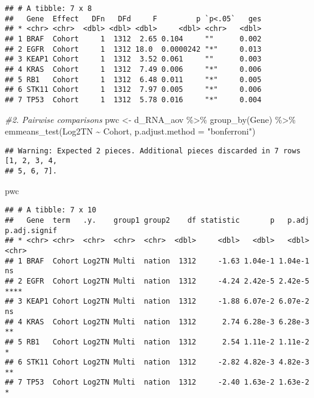 \documentclass[
]{article}
\newenvironment{Shaded}{\begin{snugshade}}{\end{snugshade}}
\newcommand{\AttributeTok}[1]{\textcolor[rgb]{0.77,0.63,0.00}{#1}}
\newcommand{\CommentTok}[1]{\textcolor[rgb]{0.56,0.35,0.01}{\textit{#1}}}
\newcommand{\FunctionTok}[1]{\textcolor[rgb]{0.00,0.00,0.00}{#1}}
\newcommand{\NormalTok}[1]{#1}
\newcommand{\OtherTok}[1]{\textcolor[rgb]{0.56,0.35,0.01}{#1}}
\newcommand{\SpecialCharTok}[1]{\textcolor[rgb]{0.00,0.00,0.00}{#1}}
\newcommand{\StringTok}[1]{\textcolor[rgb]{0.31,0.60,0.02}{#1}}
\begin{document}
\begin{verbatim}
## # A tibble: 7 x 8
##   Gene  Effect   DFn   DFd     F         p `p<.05`   ges
## * <chr> <chr>  <dbl> <dbl> <dbl>     <dbl> <chr>   <dbl>
## 1 BRAF  Cohort     1  1312  2.65 0.104     ""      0.002
## 2 EGFR  Cohort     1  1312 18.0  0.0000242 "*"     0.013
## 3 KEAP1 Cohort     1  1312  3.52 0.061     ""      0.003
## 4 KRAS  Cohort     1  1312  7.49 0.006     "*"     0.006
## 5 RB1   Cohort     1  1312  6.48 0.011     "*"     0.005
## 6 STK11 Cohort     1  1312  7.97 0.005     "*"     0.006
## 7 TP53  Cohort     1  1312  5.78 0.016     "*"     0.004
\end{verbatim}

\begin{Shaded}
\begin{Highlighting}[]
\CommentTok{\#2. Pairwise comparisons}
\NormalTok{pwc }\OtherTok{\textless{}{-}}\NormalTok{ d\_RNA\_aov }\SpecialCharTok{\%\textgreater{}\%} 
  \FunctionTok{group\_by}\NormalTok{(Gene) }\SpecialCharTok{\%\textgreater{}\%}
  \FunctionTok{emmeans\_test}\NormalTok{(Log2TN }\SpecialCharTok{\textasciitilde{}}\NormalTok{ Cohort, }\AttributeTok{p.adjust.method =} \StringTok{"bonferroni"}\NormalTok{) }
\end{Highlighting}
\end{Shaded}

\begin{verbatim}
## Warning: Expected 2 pieces. Additional pieces discarded in 7 rows [1, 2, 3, 4,
## 5, 6, 7].
\end{verbatim}

\begin{Shaded}
\begin{Highlighting}[]
\NormalTok{pwc}
\end{Highlighting}
\end{Shaded}

\begin{verbatim}
## # A tibble: 7 x 10
##   Gene  term   .y.    group1 group2    df statistic       p   p.adj p.adj.signif
## * <chr> <chr>  <chr>  <chr>  <chr>  <dbl>     <dbl>   <dbl>   <dbl> <chr>       
## 1 BRAF  Cohort Log2TN Multi  nation  1312     -1.63 1.04e-1 1.04e-1 ns          
## 2 EGFR  Cohort Log2TN Multi  nation  1312     -4.24 2.42e-5 2.42e-5 ****        
## 3 KEAP1 Cohort Log2TN Multi  nation  1312     -1.88 6.07e-2 6.07e-2 ns          
## 4 KRAS  Cohort Log2TN Multi  nation  1312      2.74 6.28e-3 6.28e-3 **          
## 5 RB1   Cohort Log2TN Multi  nation  1312      2.54 1.11e-2 1.11e-2 *           
## 6 STK11 Cohort Log2TN Multi  nation  1312     -2.82 4.82e-3 4.82e-3 **          
## 7 TP53  Cohort Log2TN Multi  nation  1312     -2.40 1.63e-2 1.63e-2 *
\end{verbatim}
\end{document}
